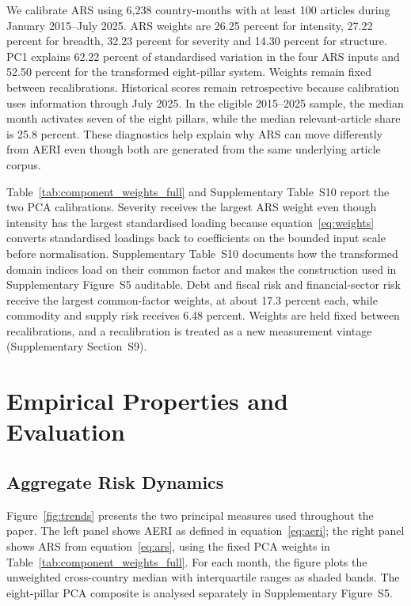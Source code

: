 \documentclass[12pt]{article}
\begin{document}
We calibrate ARS using 6,238 country-months with at least 100 articles during January 2015--July 2025. ARS weights are 26.25 percent for intensity, 27.22 percent for breadth, 32.23 percent for severity and 14.30 percent for structure. PC1 explains 62.22 percent of standardised variation in the four ARS inputs and 52.50 percent for the transformed eight-pillar system. Weights remain fixed between recalibrations. Historical scores remain retrospective because calibration uses information through July 2025. In the eligible 2015--2025 sample, the median month activates seven of the eight pillars, while the median relevant-article share is 25.8 percent. These diagnostics help explain why ARS can move differently from AERI even though both are generated from the same underlying article corpus.

Table~\ref{tab:component_weights_full} and Supplementary Table~S10 report the two PCA calibrations. Severity receives the largest ARS weight even though intensity has the largest standardised loading because equation~\eqref{eq:weights} converts standardised loadings back to coefficients on the bounded input scale before normalisation. Supplementary Table~S10 documents how the transformed domain indices load on their common factor and makes the construction used in Supplementary Figure~S5 auditable. Debt and fiscal risk and financial-sector risk receive the largest common-factor weights, at about 17.3 percent each, while commodity and supply risk receives 6.48 percent. Weights are held fixed between recalibrations, and a recalibration is treated as a new measurement vintage (Supplementary Section~S9).


\section{Empirical Properties and Evaluation}\label{sec:results}
\subsection{Aggregate Risk Dynamics}\label{sec:aggregate_risk}
Figure~\ref{fig:trends} presents the two principal measures used throughout the paper. The left panel shows AERI as defined in equation~\eqref{eq:aeri}; the right panel shows ARS from equation~\eqref{eq:ars}, using the fixed PCA weights in Table~\ref{tab:component_weights_full}. For each month, the figure plots the unweighted cross-country median with interquartile ranges as shaded bands. The eight-pillar PCA composite is analysed separately in Supplementary Figure~S5.
\end{document}

